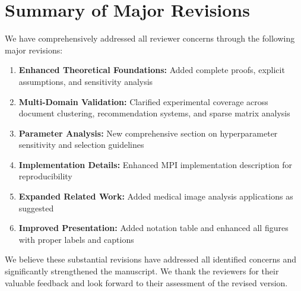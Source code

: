 \documentclass{ar2rc}
\begin{document}

\section{Summary of Major Revisions}

We have comprehensively addressed all reviewer concerns through the following major revisions:

\begin{enumerate}
  \item \textbf{Enhanced Theoretical Foundations:} Added complete proofs, explicit assumptions, and sensitivity analysis
  \item \textbf{Multi-Domain Validation:} Clarified experimental coverage across document clustering, recommendation systems, and sparse matrix analysis
  \item \textbf{Parameter Analysis:} New comprehensive section on hyperparameter sensitivity and selection guidelines
  \item \textbf{Implementation Details:} Enhanced MPI implementation description for reproducibility
  \item \textbf{Expanded Related Work:} Added medical image analysis applications as suggested
  \item \textbf{Improved Presentation:} Added notation table and enhanced all figures with proper labels and captions
\end{enumerate}

We believe these substantial revisions have addressed all identified concerns and significantly strengthened the manuscript. We thank the reviewers for their valuable feedback and look forward to their assessment of the revised version.

\printbibliography
\end{document}
